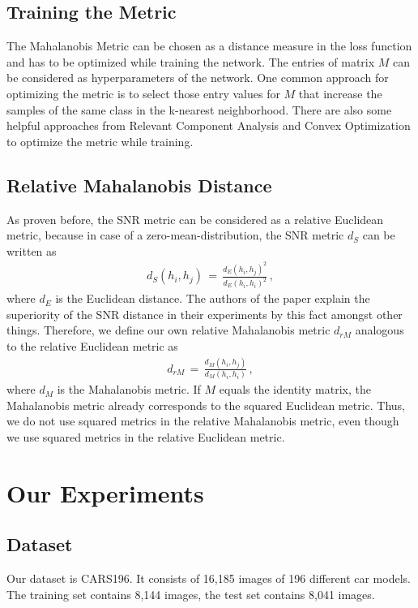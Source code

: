 \documentclass[12pt,paper=a4]{scrartcl}
\theoremstyle{break}
\begin{document}
\subsection{Training the Metric}
The Mahalanobis Metric can be chosen as a distance measure in the loss function and has to be optimized while training the network. The entries of matrix $M$ can be considered as hyperparameters of the network. One common approach for optimizing the metric is to select those entry values for $M$ that increase the samples of the same class in the k-nearest neighborhood. There are also some helpful approaches from Relevant Component Analysis and Convex Optimization to optimize the metric while training.\cite{mahalanobis}
\subsection{Relative Mahalanobis Distance}
As proven before, the SNR metric can be considered as a relative Euclidean metric, because in case of a zero-mean-distribution, the SNR metric $d_S$ can be written as
\begin{align}
d_S(h_i, h_j)\, =\,\frac{d_E(h_i,h_j)^2}{d_E(h_i, h_i)^2}\, ,
\end{align}
where $d_E$ is the Euclidean distance. The authors of the paper explain the superiority of the SNR distance in their experiments by this fact amongst other things. Therefore, we define our own relative Mahalanobis metric $d_{rM}$ analogous to the relative Euclidean metric as
\begin{align}
d_{rM}\, =\, \frac{d_M(h_i,h_j)}{d_M(h_i,h_i)}\, ,
\end{align}
where $d_M$ is the Mahalanobis metric. If $M$ equals the identity matrix, the Mahalanobis metric already corresponds to the squared Euclidean metric. Thus, we do not use squared metrics in the relative Mahalanobis metric, even though we use squared metrics in the relative Euclidean metric.
\section{Our Experiments}
\subsection{Dataset}
Our dataset is CARS196. It consists of 16,185 images of 196 different car models. The training set contains 8,144 images, the test set contains 8,041 images.
\end{document}
